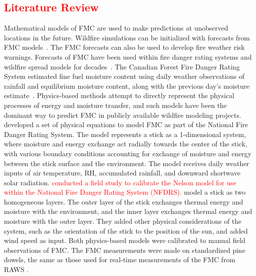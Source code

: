 \documentclass[fire,article,submit,pdftex,moreauthors]{Definitions/mdpi}
\begin{document}
\subsection{\textcolor{red}{Literature Review}}
Mathematical models of FMC are used to make predictions at unobserved locations in the future. Wildfire simulations can be initialized with forecasts from FMC models~\citep[e.g.,][]{Mandel-2014-RAA}. The FMC forecasts can also be used to develop fire weather risk warnings. Forecasts of FMC have been used within fire danger rating systems and wildfire spread models for decades~\citep[e.g.,][]{VanWagner-1985-EFP}. The Canadian Forest Fire Danger Rating System estimated fine fuel moisture content using daily weather observations of rainfall and equilibrium moisture content, along with the previous day's moisture estimate~\citep{VanWagner-1987-DSC}. Physics-based methods attempt to directly represent the physical processes of energy and moisture transfer, and such models have been the dominant way to predict FMC in publicly available wildfire modeling projects. \citet{Nelson-2000-PDC} developed a set of physical equations to model FMC as part of the National Fire Danger Rating System. The model represents a stick as a 1-dimensional system, where moisture and energy exchange act radially towards the center of the stick, with various boundary conditions accounting for exchange of moisture and energy between the stick surface and the environment. The model receives daily weather inputs of air temperature, RH, accumulated rainfall, and downward shortwave solar radiation. \textcolor{red}{\citet{Carlson-2007-ANM} conducted a field study to calibrate the Nelson model for use within the National Fire Danger Rating System (NFDRS).} \citet{vanderKamp-2017-MFS} model a stick as two homogeneous layers. The outer layer of the stick exchanges thermal energy and moisture with the environment, and the inner layer exchanges thermal energy and moisture with the outer layer. They added other physical considerations of the system, such as the orientation of the stick to the position of the sun, and added wind speed as input. Both physics-based models were calibrated to manual field observations of FMC. The FMC measurements were made on standardized pine dowels, the same as those used for real-time measurements of the FMC from RAWS \citep{Carlson-2007-ANM}. 
\end{document}
